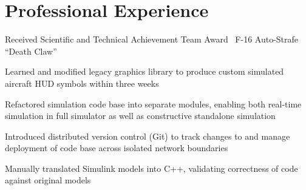 \documentclass[letterpaper]{deedy-resume}
\begin{document}
\begin{minipage}[t]{0.66\textwidth} %

	\section{Professional Experience}
	\begin{compactitem}
		\item Received Scientific and Technical Achievement Team Award \textemdash\ F-16 Auto-Strafe ``Death
            Claw''
        \item Learned and modified legacy graphics library to produce custom simulated aircraft HUD symbols
            within three weeks
		\item Refactored simulation code base into separate modules, enabling both real-time simulation in full
            simulator as well as constructive standalone simulation
        \item Introduced distributed version control (Git) to track changes to and manage deployment of code
            base across isolated network boundaries
        \item Manually translated Simulink models into C++, validating correctness of code against original
            models
	\end{compactitem}
    \vspace{3em}


\end{minipage}
\end{document}
